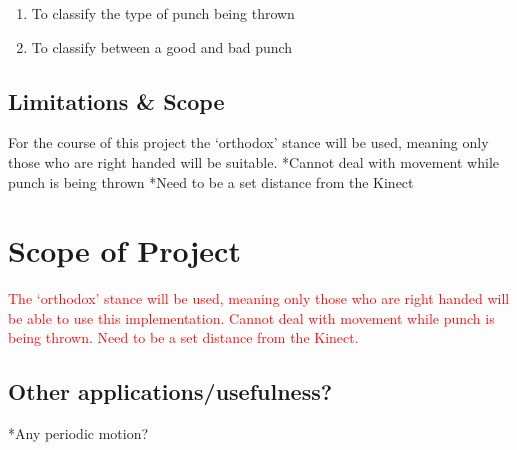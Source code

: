 \begin{enumerate}
  \item To classify the type of punch being thrown
  \item To classify between a good and bad punch
\end{enumerate}

\subsection{Limitations \& Scope}
\label{subsec:subsec01}
For the course of this project the `orthodox' stance will be used, meaning only those who are right handed will be suitable.
*Cannot deal with movement while punch is being thrown
*Need to be a set distance from the Kinect

\section{Scope of Project}
\label{sec:sec01}
\textcolor{red}{
The `orthodox' stance will be used, meaning only those who are right handed will be able to use this implementation.
Cannot deal with movement while punch is being thrown.
Need to be a set distance from the Kinect.}


\subsection{Other applications/usefulness?}
\label{subsec:subsec01}
*Any periodic motion?
